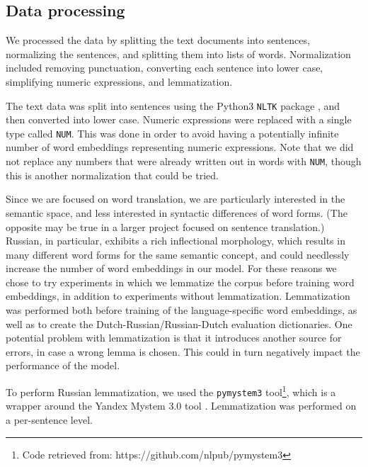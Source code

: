 \documentclass{article}
\begin{document}
\subsection{Data processing}

We processed the data by splitting the text documents into sentences, normalizing the sentences, and splitting them into lists of words. Normalization included removing punctuation, converting each sentence into lower case, simplifying numeric expressions, and lemmatization.

The text data was split into sentences using the Python3 \texttt{NLTK} package \citep{bird2009natural}, and then converted into lower case. Numeric expressions were replaced with a single type called \texttt{NUM}. This was done in order to avoid having a potentially infinite number of word embeddings representing numeric expressions. Note that we did not replace any numbers that were already written out in words with \texttt{NUM}, though this is another normalization that could be tried. 

Since we are focused on word translation, we are particularly interested in the semantic space, and less interested in syntactic differences of word forms. (The opposite may be true in a larger project focused on sentence translation.) Russian, in particular, exhibits a rich inflectional morphology, which results in many different word forms for the same semantic concept, and could needlessly increase the number of word embeddings in our model. For these reasons we chose to try experiments in which we lemmatize the corpus before training word embeddings, in addition to experiments without lemmatization. Lemmatization was performed both before training of the language-specific word embeddings, as well as to create the Dutch-Russian/Russian-Dutch evaluation dictionaries. One potential problem with lemmatization is that it introduces another source for errors, in case a wrong lemma is chosen. This could in turn negatively impact the performance of the model.  

To perform Russian lemmatization, we used the \texttt{pymystem3} tool\footnote{Code retrieved from: https://github.com/nlpub/pymystem3}, which is a wrapper around the Yandex Mystem 3.0 tool \citep{segalovich2003fast}. Lemmatization was performed on a per-sentence level. 
\end{document}
